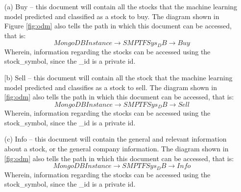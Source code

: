 \begin{itemize}
    \item[(a)] Buy – this document will contain all the stocks that 
    the machine learning model predicted and classified as a stock to buy. 
    The diagram shown in Figure \ref{fig:odm} also tells the path in which this 
    document can be accessed, that is: $$ MongoDB Instance \rightarrow SMPTFSys_DB 
    \rightarrow Buy$$ Wherein, information regarding the stocks can be accessed using 
    the stock\_symbol, since the \_id is a private id.
    \item[[b)] Sell – this document will contain all the stock that the 
    machine learning model predicted and classifies as a stock to sell. 
    The diagram shown in \ref{fig:odm} also tells the path in which this 
    document can be accessed, that is: $$ MongoDB Instance \rightarrow 
    SMPTFSys_DB \rightarrow Sell$$
     Wherein, information regarding the stocks can be accessed using the 
     stock\_symbol, since the \_id is a private id.
    \item[(c)] Info – this document will contain the general and relevant 
    information about a stock, or the general company information. 
    The diagram shown in \ref{fig:odm} also tells the path in which this 
    document can be accessed, that is: 
    $$ MongoDB Instance \rightarrow SMPTFSys_DB \rightarrow Info $$ 
    Wherein, information regarding the stocks can be accessed using the 
    stock\_symbol, since the \_id is a private id.
\end{itemize}